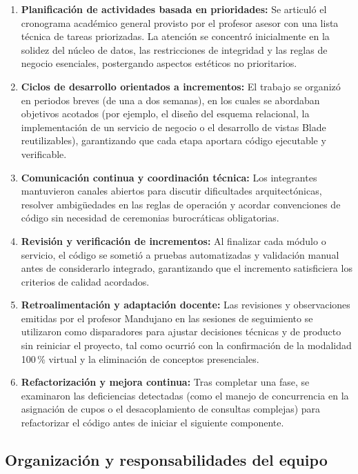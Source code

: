 \begin{enumerate}
    \item \textbf{Planificación de actividades basada en prioridades:} Se articuló el cronograma académico general provisto por el profesor asesor con una lista técnica de tareas priorizadas. La atención se concentró inicialmente en la solidez del núcleo de datos, las restricciones de integridad y las reglas de negocio esenciales, postergando aspectos estéticos no prioritarios.
    \item \textbf{Ciclos de desarrollo orientados a incrementos:} El trabajo se organizó en periodos breves (de una a dos semanas), en los cuales se abordaban objetivos acotados (por ejemplo, el diseño del esquema relacional, la implementación de un servicio de negocio o el desarrollo de vistas Blade reutilizables), garantizando que cada etapa aportara código ejecutable y verificable.
    \item \textbf{Comunicación continua y coordinación técnica:} Los integrantes mantuvieron canales abiertos para discutir dificultades arquitectónicas, resolver ambigüedades en las reglas de operación y acordar convenciones de código sin necesidad de ceremonias burocráticas obligatorias.
    \item \textbf{Revisión y verificación de incrementos:} Al finalizar cada módulo o servicio, el código se sometió a pruebas automatizadas y validación manual antes de considerarlo integrado, garantizando que el incremento satisficiera los criterios de calidad acordados.
    \item \textbf{Retroalimentación y adaptación docente:} Las revisiones y observaciones emitidas por el profesor Mandujano en las sesiones de seguimiento se utilizaron como disparadores para ajustar decisiones técnicas y de producto sin reiniciar el proyecto, tal como ocurrió con la confirmación de la modalidad 100\,\% virtual y la eliminación de conceptos presenciales.
    \item \textbf{Refactorización y mejora continua:} Tras completar una fase, se examinaron las deficiencias detectadas (como el manejo de concurrencia en la asignación de cupos o el desacoplamiento de consultas complejas) para refactorizar el código antes de iniciar el siguiente componente.
\end{enumerate}

\subsection{Organización y responsabilidades del equipo}
\label{sec:organizacion_equipo}

